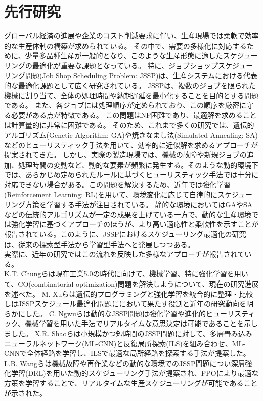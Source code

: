 \documentclass{jarticle}
\begin{document}
\section{先行研究}
グローバル経済の進展や企業のコスト削減要求に伴い、生産現場では柔軟で効率的な生産体制の構築が求められている。
その中で、需要の多様化に対応するために、少量多品種生産が一般的となり、このような生産形態に適したスケジューリングの最適化が重要な課題となっている。
特に、ジョブショップスケジューリング問題(Job Shop Scheduling Problem: JSSP)は、生産システムにおける代表的な最適化課題として広く研究されている。
JSSPは、複数のジョブを限られた機械に割り当て、全体の処理時間や納期遅延を最小化することを目的とする問題である。
また、各ジョブには処理順序が定められており、この順序を厳密に守る必要がある点が特徴である。
この問題はNP困難であり、最適解を求めることは計算量的に非常に困難である。
そのため、これまで多くの研究では、遺伝的アルゴリズム(Genetic Algorithm: GA)や焼きなまし法(Simulated Annealing: SA)などのヒューリスティック手法を用いて、効率的に近似解を求めるアプローチが提案されてきた。
しかし、実際の製造現場では、機械の故障や新規ジョブの追加、処理時間の変動など、動的な要素が頻繁に発生する。そのような動的環境下では、あらかじめ定められたルールに基づくヒューリスティック手法では十分に対応できない場合がある。この問題を解決するため、近年では強化学習(Reinforcement Learning: RL)を用いて、環境変化に応じて自律的にスケジューリング方策を学習する手法が注目されている。
静的な環境においてはGAやSAなどの伝統的アルゴリズムが一定の成果を上げている一方で、動的な生産環境では強化学習に基づくアプローチのほうが、より高い適応性と柔軟性を示すことが報告されている。このように、JSSPにおけるスケジューリング最適化の研究は、従来の探索型手法から学習型手法へと発展しつつある。\\
実際に、近年の研究ではこの流れを反映した多様なアプローチが報告されている。\\
K.T. Chungら\cite{ref1}は現在工業5.0の時代に向けて、機械学習、特に強化学習を用いて、CO(combinatorial optimization)問題を解決しようについて、現在の研究進展を述べた。
M. Xuら\cite{ref2}は遺伝的プログラミングと強化学習を統合的に整理・比較しはJSSPスケジュール最適化問題ににおいて果たす役割と近年の研究動向を明らかにした。
C. Ngwuら\cite{ref3}は動的なJSSP問題は強化学習や進化的ヒューリスティック、機械学習を用いた手法でリアルタイムな意思決定は可能であることを示しました。
X.R. Shaoら\cite{ref4}は小規模かつ短時間のJSSP問題に対して、多層畳み込みニューラルネットワーク(ML-CNN)と反復局所探索(ILS)を組み合わせ、ML-CNNで全体経路を学習し、ILSで最適な局所経路を探索する手法が提案した。
L.B. Wangら\cite{ref5}は機械故障や再作業などの動的な環境でのJSSP問題につい深層強化学習(DRL)を用いた動的スケジューリング手法が提案され、PPOにより最適な方策を学習することで、リアルタイムな生産スケジューリングが可能であることが示された。
\end{document}
